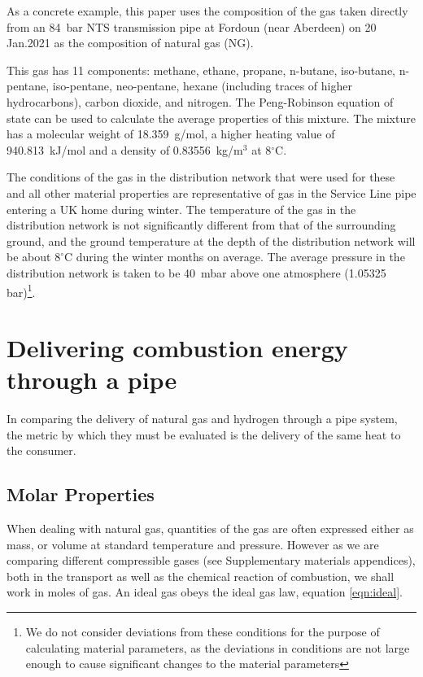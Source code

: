 \documentclass[5p]{elsarticle} %
\begin{document}
As a concrete example, this paper uses the composition of the gas taken directly from an 84~bar NTS transmission pipe at Fordoun (near Aberdeen) on 20 Jan.2021\citep{cngservices2019} as the composition of natural gas (NG). 

This gas has 11 components: methane, ethane, propane, n-butane, iso-butane, n-pentane, iso-pentane, neo-pentane, hexane (including traces of higher hydrocarbons), carbon dioxide, and nitrogen. 
The Peng-Robinson equation of state can be used to calculate the average properties of this mixture\citep{Sargents_github}. 
The mixture has a molecular weight of 18.359~g/mol, a higher heating value of 940.813~kJ/mol and a density of 0.83556~kg/m$^3$ at 8$^\circ$C.

The conditions of the gas in the distribution network that were used for these and all other material properties are representative of gas in the Service Line pipe entering a UK home during winter. 
The temperature of the gas in the distribution network is not significantly different from that of the surrounding ground, and the ground temperature at the depth of the distribution network will be about $8^\circ$C during the winter months on average\citep{MacKay2008}.
The average pressure in the distribution network is taken to be 40~mbar above one atmosphere (1.05325 bar)\citep{ARUP2023,utonomy23}\footnote{We do not consider deviations from these conditions for the purpose of calculating material parameters, as the deviations in conditions are not large enough to cause significant changes to the material parameters}.

\section{Delivering combustion energy through a pipe}
\label{sec:pipe}

In comparing the delivery of natural gas and hydrogen through a pipe system, the metric by which they must be evaluated is the delivery of the same heat to the consumer. 

\subsection{Molar Properties}
\label{sec:molar}

When dealing with natural gas, quantities of the gas are often expressed either as mass, or volume at standard temperature and pressure. 
However as we are comparing different compressible gases (see 
Supplementary materials appendices),
both in the transport as well as the chemical reaction of combustion, we shall work in moles of gas.
An ideal gas obeys the ideal gas law, equation \eqref{eqn:ideal}.
\end{document}
